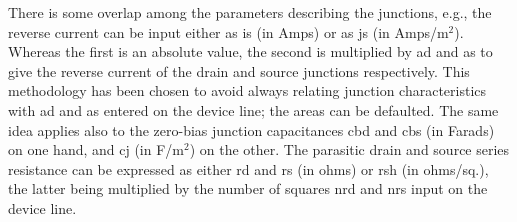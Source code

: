 There is some overlap among the parameters describing the junctions,
e.g., the reverse current can be input either as {\vt is} (in Amps) or
as {\vt js} (in Amps/m$^2$).  Whereas the first is an absolute value,
the second is multiplied by {\vt ad} and {\vt as} to give the reverse
current of the drain and source junctions respectively.  This
methodology has been chosen to avoid always relating junction
characteristics with {\vt ad} and {\vt as} entered on the device line;
the areas can be defaulted.  The same idea applies also to the
zero-bias junction capacitances {\vt cbd} and {\vt cbs} (in Farads) on
one hand, and {\vt cj} (in F/m$^2$) on the other.  The parasitic drain
and source series resistance can be expressed as either {\vt rd} and
{\vt rs} (in ohms) or {\vt rsh} (in ohms/sq.), the latter being
multiplied by the number of squares {\vt nrd} and {\vt nrs} input on
the device line.


